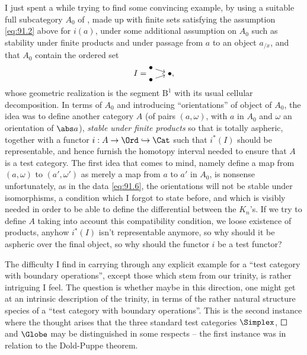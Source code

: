 I just spent a while trying to find some convincing example, by using
a suitable full subcategory $A_0$ of \Ord, made up with finite sets
satisfying the assumption \eqref{eq:91.2} above for $i(a)$, under some
additional assumption on $A_0$ such as stability under finite products
and under passage from $a$ to an object $a_{/x}$, and that $A_0$
contain the ordered set
\[I =
\begin{tikzcd}[baseline=(O.base),cramped,row sep=-3pt,column sep=small]
  \bullet\ar[dr] & \\ & |[alias=O]| \bullet \\ \bullet\ar[ur] &
\end{tikzcd},\]
whose geometric realization is the segment $\mathrm B^1$ with its
usual cellular decomposition. In terms of $A_0$ and introducing
``orientations'' of object of $A_0$, the idea was to define another
category $A$ (of pairs $(a,\omega)$, with $a$ in $A_0$ and $\omega$ an
orientation of $\abs a$), \emph{stable under finite products} so that
\Ahat{} is totally aspheric, together with a functor
$i:A\to\Ord\hookrightarrow\Cat$ such that $i^*(I)$ should be
representable, and hence furnish the homotopy interval needed to
ensure that $A$ is a test category. The first idea that comes to mind,
namely define a map from $(a,\omega)$ to $(a',\omega')$ as merely a
map from $a$ to $a'$ in $A_0$, is nonsense unfortunately, as in the
data \eqref{eq:91.6}, the orientations will not be stable under
isomorphisms, a condition which I forgot to state before, and which is
visibly needed in order to be able to define the differential between
the $K_n$'s. If we try to define $A$ taking into account this
compatibility condition, we loose existence of products, anyhow
$i^*(I)$ isn't representable anymore, so why should it be aspheric
over the final object, so why should the functor $i$ be a test functor?

The difficulty I find in carrying through any explicit example for a
``test category with boundary operations'', except those which stem
from our trinity, is rather intriguing I feel. The question is whether
maybe in this direction, one might get at an intrinsic description of
the trinity, in terms of the rather natural structure species of a
``test category with boundary operations''. This is the second
instance where the thought arises that the three standard test
categories $\Simplex$, $\Square$ and $\Globe$ may be distinguished in
some respects -- the first instance was in relation to the Dold-Puppe
theorem.

